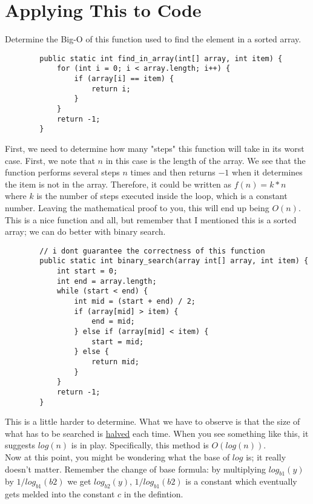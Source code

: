 \documentclass[11pt]{book}
\begin{document}
	\section{Applying This to Code}
		Determine the Big-O of this function used to find the element in a sorted
		array.
		\begin{verbatim}
		public static int find_in_array(int[] array, int item) {
		    for (int i = 0; i < array.length; i++) {
		        if (array[i] == item) {
		            return i;
		        }
		    }
		    return -1;
		}
		\end{verbatim}
		First, we need to determine how many "steps" this function will take in its worst
		case. First, we note that $n$ in this case is the length of the array.
		We see that the function performs several steps $n$ times and then returns $-1$ when
		it determines the item is not in the array. Therefore, it could be written as
		$f(n) = k * n$ where $k$ is the number of steps executed inside the loop, which
		is a constant number. Leaving the mathematical proof to you, this will end up being
		$O(n)$. \\

		\noindent This is a nice function and all, but remember that I mentioned this is a sorted
		array; we can do better with binary search.

		\begin{verbatim}
		// i dont guarantee the correctness of this function
		public static int binary_search(array int[] array, int item) {
		    int start = 0;
		    int end = array.length;
		    while (start < end) {
		        int mid = (start + end) / 2;
		        if (array[mid] > item) {
		            end = mid;
		        } else if (array[mid] < item) {
		            start = mid;
		        } else {
		            return mid;
		        }
		    }
		    return -1;
		}
		\end{verbatim}

		\noindent This is a little harder to determine. What we have to observe is that the size
		of what has to be searched is \underline{halved} each time. When you see something
		like this, it suggests $log(n)$ is in play. Specifically, this method is $O(log(n))$. \\

		\noindent Now at this point, you might be wondering what the base of $log$ is; it really
		doesn't matter. Remember the change of base formula: by multiplying $log_{b1}(y)$ by
		$1 / log_{b1}(b2)$ we get $log_{b2}(y)$, $1 / log_{b1}(b2)$ is a constant which eventually
		gets melded into the constant $c$ in the defintion.
\end{document}
